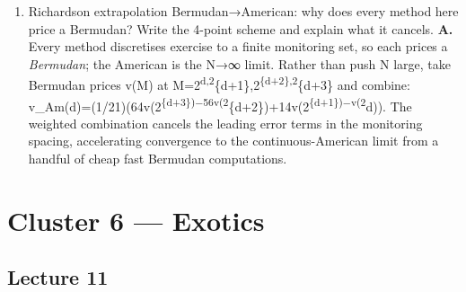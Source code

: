 \documentclass[
  11pt,
]{article}
\begin{document}
\begin{enumerate}
  recursion and the Newton x\_n* must land inside {[}a,b{]}. At short
  maturity (or small per-step Δt) c\_2=σ²Δt→0, so the box collapses
  toward c\_1; for a Gaussian model c\_4=0 means no √c\_4 floor --- the
  same failure mode as the Assignment-2 bug. Adding cosine terms K
  cannot cure a range (truncation) error; the fix is a wider L or a
  minimum half-width floor. It bites per-step because each of the N
  steps re-uses the same possibly-too-narrow box.
\item
  Richardson extrapolation Bermudan→American: why does every method here
  price a Bermudan? Write the 4-point scheme and explain what it
  cancels. \textbf{A.} Every method discretises exercise to a finite
  monitoring set, so each prices a \emph{Bermudan}; the American is the
  N→∞ limit. Rather than push N large, take Bermudan prices v(M) at
  M=2\textsuperscript{d,2}\{d+1\},2\textsuperscript{\{d+2\},2}\{d+3\}
  and combine:
  v\_Am(d)=(1/21)(64v(2\textsuperscript{\{d+3\})−56v(2}\{d+2\})+14v(2\textsuperscript{\{d+1\})−v(2}d)).
  The weighted combination cancels the leading error terms in the
  monitoring spacing, accelerating convergence to the
  continuous-American limit from a handful of cheap fast Bermudan
  computations.
\end{enumerate}

\hypertarget{cluster-6-exotics}{%
\section{Cluster 6 --- Exotics}\label{cluster-6-exotics}}

\hypertarget{lecture-11}{%
\subsection{Lecture 11}\label{lecture-11}}
\end{document}
